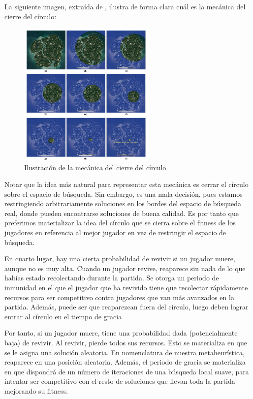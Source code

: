\documentclass[11pt]{article}
\begin{document}
La siguiente imagen, extraída de \cite{other_paper:paper}, ilustra de forma clara cuál es la mecánica del cierre del círculo:

\begin{figure}[H]
    \centering
    \includegraphics[width=0.6\textwidth]{cierre_circulo}
    \caption{Ilustración de la mecánica del cierre del círculo}
\end{figure}

Notar que la idea más natural para representar esta mecánica es cerrar el círculo sobre el espacio de búsqueda. Sin embargo, es una mala decisión, pues estamos restringiendo arbitrariamente soluciones en los bordes del espacio de búsqueda real, donde pueden encontrarse soluciones de buena calidad. Es por tanto que preferimos materializar la idea del círculo que se cierra sobre el fitness de los jugadores en referencia al mejor jugador en vez de restringir el espacio de búsqueda.

En cuarto lugar, hay una cierta probabilidad de revivir si un jugador muere, aunque no es muy alta. Cuando un jugador revive, reaparece sin nada de lo que habías estado recolectando durante la partida. Se otorga un periodo de inmunidad en el que el jugador que ha revivido tiene que recolectar rápidamente recursos para ser competitivo contra jugadores que van más avanzados en la partida. Además, puede ser que reaparezcan fuera del círculo, luego deben lograr entrar al círculo en el tiempo de gracia

Por tanto, si un jugador muere, tiene una probabilidad dada (potencialmente baja) de revivir. Al revivir, pierde todos sus recursos. Esto se materializa en que se le asigna una solución aleatoria. En nomenclatura de nuestra metaheurística, reaparece en una posición aleatoria. Además, el periodo de gracia se materializa en que dispondrá de un número de iteraciones de una búsqueda local suave,  para intentar ser competitivo con el resto de soluciones que llevan toda la partida mejorando su fitness.
\end{document}

